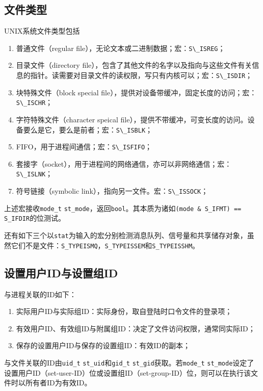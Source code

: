 \documentclass{ctexart}
\newcommand{\cod}[1]{\lstinline!#1!}
\newcommand{\struct}{\cod}
\newcommand{\clname}[2]{\struct{#1} \cod{#2}}
\begin{document}
  \subsection{文件类型}
  UNIX系统文件类型包括
  \begin{enumerate}
    \item 普通文件（regular file），无论文本或二进制数据；宏：\cod{S\_ISREG}；
    \item 目录文件（directory file），包含了其他文件的名字以及指向与这些文件有关信息的指针。读需要对目录文件的读权限，写只有内核可以；宏：\cod{S\_ISDIR}；
    \item 块特殊文件（block special file），提供对设备带缓冲，固定长度的访问；宏：\cod{S\_ISCHR}；
    \item 字符特殊文件（character speical file），提供不带缓冲，可变长度的访问。设备要么是它，要么是前者；宏：\cod{S\_ISBLK}；
    \item FIFO，用于进程间通信；宏：\cod{S\_ISFIFO}；
    \item 套接字（socket），用于进程间的网络通信，亦可以非网络通信；宏：\cod{S\_ISLNK}；
    \item 符号链接（symbolic link），指向另一文件。宏：\cod{S\_ISSOCK}；
  \end{enumerate}
  上述宏接收\clname{mode_t}{st_mode}，返回\struct{bool}。其本质为诸如\cod{(mode & S_IFMT) == S_IFDIR}的位测试。
  \par
  还有如下三个以\struct{stat}为输入的宏分别检测消息队列、信号量和共享储存对象，虽然它们不是文件：\cod{S_TYPEISMQ}，\cod{S_TYPEISSEM}和\cod{S_TYPEISSHM}。
  \subsection{设置用户ID与设置组ID}
  与进程关联的ID如下：
  \begin{enumerate}
    \item 实际用户ID与实际组ID：实际身份，取自登陆时口令文件的登录项；
    \item 有效用户ID、有效组ID与附属组ID：决定了文件访问权限，通常同实际ID；
    \item 保存的设置用户ID与保存的设置组ID：有效ID的副本；
  \end{enumerate}
  \par
  与文件关联的ID由\clname{uid_t}{st_uid}和\clname{gid_t}{st_gid}获取。若\clname{mode_t}{st_mode}设定了设置用户ID（set-user-ID）位或设置组ID（set-group-ID）位，则可以在执行该文件时以所有者ID为有效ID。
\end{document}
